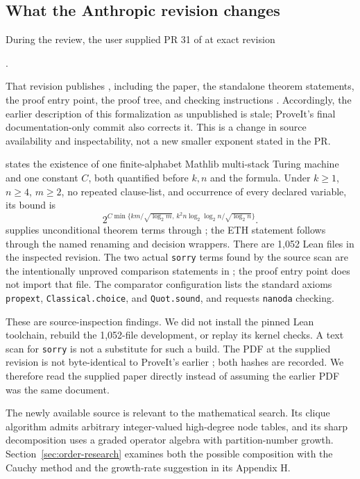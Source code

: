 \subsection{What the Anthropic revision changes}
During the review, the user supplied PR 31 of 
at exact revision
\begin{center}\ap.\end{center}
That revision publishes ,
including the paper, the standalone theorem statements, the proof entry
point, the proof tree, and checking instructions \cite{anthropic}.
Accordingly, the earlier description of this formalization as unpublished
is stale; ProveIt's final documentation-only commit also corrects it.
This is a change in source availability and inspectability, not a
new smaller exponent stated in the PR.

 states the existence of one finite-alphabet
Mathlib multi-stack Turing machine and one constant $C$, both quantified
before $k,n$ and the formula. Under $k\ge1$, $n\ge4$, $m\ge2$, no repeated
clause-list, and occurrence of every declared variable, its bound is
\[
 2^{C\min\{km/\sqrt{\log_2m},\,
             k^2n\log_2\log_2n/\sqrt{\log_2n}\}}.
\]
 supplies unconditional theorem terms through
; the ETH statement follows through
the named renaming and decision wrappers. There are 1,052 Lean files in
the inspected revision. The two actual \texttt{sorry} terms found by the
source scan are the intentionally unproved comparison statements in
; the proof entry point does not import that file.
The comparator configuration lists the standard axioms
\texttt{propext}, \texttt{Classical.choice}, and \texttt{Quot.sound}, and
requests \texttt{nanoda} checking.

These are source-inspection findings. We did not install the pinned Lean
toolchain, rebuild the 1,052-file development, or replay its kernel checks.
A text scan for \texttt{sorry} is not a substitute for such a build.
The PDF at the supplied revision is not byte-identical to ProveIt's earlier
; both hashes are recorded. We therefore
read the supplied paper directly instead of assuming the earlier PDF was
the same document.

The newly available source is relevant to the mathematical search. Its
clique algorithm admits arbitrary integer-valued high-degree node tables, and its sharp
decomposition uses a graded operator algebra with partition-number growth.
Section~\ref{sec:order-research} examines both the possible composition with the
Cauchy method and the growth-rate suggestion in its Appendix H.
